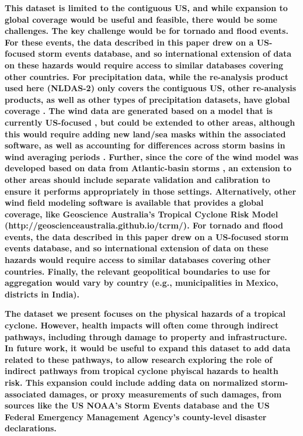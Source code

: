 \textbf{This dataset is limited to the contiguous US, and while expansion to
global coverage would be useful and feasible, there would be some challenges.
The key challenge would be for tornado and flood events. For these events, the
data described in this paper drew on a US-focused storm events database, and so
international extension of data on these hazards would require access to
similar databases covering other countries.  For precipitation data, while the
re-analysis product used here (NLDAS-2) only covers the contiguous US, other
re-analysis products, as well as other types of precipitation datasets, have
global coverage \parencite{sun2018review}. The wind data are generated based on
a model that is currently US-focused \parencite{stormwindmodel}, but could be
extended to other areas, although this would require adding new land/sea masks
within the associated software, as well as accounting for differences across
storm basins in wind averaging periods \parencite{harper2010guidelines}.
Further, since the core of the wind model was developed based on data from
Atlantic-basin storms \parencite{willoughby2006parametric}, an extension to
other areas should include separate validation and calibration to ensure it
performs appropriately in those settings. Alternatively, other wind field
modeling software is available that provides a global coverage, like Geoscience
Australia's Tropical Cyclone Risk Model
(http://geoscienceaustralia.github.io/tcrm/). For tornado and flood events, the
data described in this paper drew on a US-focused storm events database, and so
international extension of data on these hazards would require access to
similar databases covering other countries. Finally, the relevant geopolitical
boundaries to use for aggregation would vary by country (e.g., municipalities
in Mexico, districts in India).}

\textbf{The dataset we present focuses on the physical hazards of a tropical
cyclone. However, health impacts will often come through indirect pathways,
including through damage to property and infrastructure. In future work, it
would be useful to expand this dataset to add data related to these pathways,
to allow research exploring the role of indirect pathways from tropical cyclone
phyiscal hazards to health risk. This expansion could include adding data on
normalized storm-associated damages, or proxy measurements of such damages,
from sources like the US NOAA's Storm Events database and the US Federal
Emergency Management Agency's county-level disaster declarations.}

